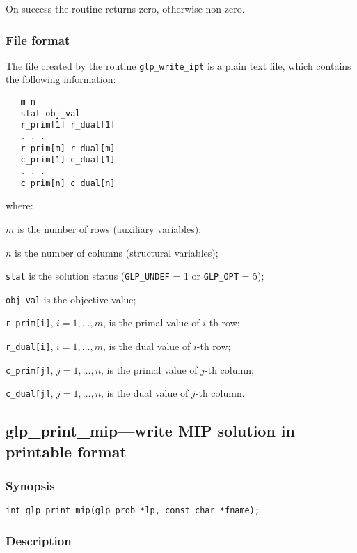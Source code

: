 On success the routine returns zero, otherwise non-zero.

\subsubsection*{File format}

The file created by the routine \verb|glp_write_ipt| is a plain text
file, which contains the following information:

\begin{verbatim}
   m n
   stat obj_val
   r_prim[1] r_dual[1]
   . . .
   r_prim[m] r_dual[m]
   c_prim[1] c_dual[1]
   . . .
   c_prim[n] c_dual[n]
\end{verbatim}

\noindent
where:

\noindent
$m$ is the number of rows (auxiliary variables);

\noindent
$n$ is the number of columns (structural variables);

\noindent
\verb|stat| is the solution status (\verb|GLP_UNDEF| = 1 or
\verb|GLP_OPT| = 5);

\noindent
\verb|obj_val| is the objective value;

\noindent
\verb|r_prim[i]|, $i=1,\dots,m$, is the primal value of $i$-th row;

\noindent
\verb|r_dual[i]|, $i=1,\dots,m$, is the dual value of $i$-th row;

\noindent
\verb|c_prim[j]|, $j=1,\dots,n$, is the primal value of $j$-th column;

\noindent
\verb|c_dual[j]|, $j=1,\dots,n$, is the dual value of $j$-th column.

\subsection{glp\_print\_mip---write MIP solution in printable format}

\subsubsection*{Synopsis}

\begin{verbatim}
int glp_print_mip(glp_prob *lp, const char *fname);
\end{verbatim}

\subsubsection*{Description}

